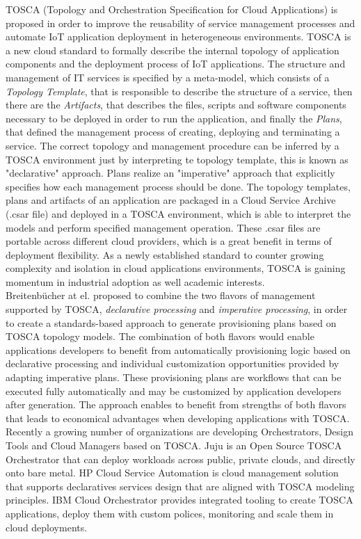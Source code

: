 TOSCA (Topology and Orchestration Specification for Cloud Applications) \cite{li2013towards} is proposed in order to improve the reusability of service management
processes and automate IoT application deployment in heterogeneous environments. TOSCA is a new cloud standard to formally describe the internal topology of
application components and the deployment process of IoT applications. The structure and management of IT services is specified by a meta-model, which consists
of a \textit{Topology Template}, that is responsible to describe the structure of a service, then there are the \textit{Artifacts}, that describes the files, scripts and
software components necessary to be deployed in order to run the application, and finally the \textit{Plans}, that defined the management process of creating, deploying and
terminating a service. The correct topology and management procedure can be inferred by a TOSCA environment just by interpreting te topology template, this is known
as "declarative" approach. Plans realize an "imperative" approach that explicitly specifies how each management process should be done. The topology templates, plans
and artifacts of an application are packaged in a Cloud Service Archive (.csar file) and deployed in a TOSCA environment, which is able to interpret the models and perform
specified management operation. These .csar files are portable across different cloud providers, which is a great benefit in terms of deployment flexibility.
As a newly established standard to counter growing complexity and isolation in cloud applications environments, TOSCA is gaining momentum in industrial adoption as well academic interests.\\

Breitenb\"{u}cher at el. \cite{breitenbucher2014combining} proposed to combine the two flavors of management supported by TOSCA, \textit{declarative processing} and
\textit{imperative processing}, in order to create a standards-based approach to generate provisioning plans based on TOSCA topology models. The
combination of both flavors would enable applications developers to benefit from automatically provisioning logic based on declarative processing and
individual customization opportunities provided by adapting imperative plans. These provisioning plans are workflows that can be executed fully automatically and
may be customized by application developers after generation. The approach enables to benefit from strengths of both flavors that leads to economical advantages
when developing applications with TOSCA.\\

Recently a growing number of organizations are developing Orchestrators, Design Tools and Cloud Managers based on TOSCA. Juju is an Open Source TOSCA Orchestrator that
can deploy workloads across public, private clouds, and directly onto bare metal. HP Cloud Service Automation is cloud management solution that supports declaratives
services design that are aligned with TOSCA modeling principles. IBM Cloud Orchestrator provides integrated tooling to create TOSCA applications, deploy them with custom
polices, monitoring and scale them in cloud deployments.
